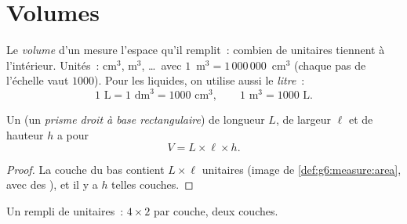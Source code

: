 \section{Volumes}

\begin{definition}[Volume]\label{def:g6:measure:volume}
Le \emph{volume} d'un  mesure l'espace qu'il
remplit~: combien de  unitaires tiennent à l'intérieur.
Unités~: cm$^3$, m$^3$, \dots\ avec
$1$~m$^3 = 1\,000\,000$~cm$^3$ (chaque pas de l'échelle vaut
$1000$). Pour les liquides, on utilise aussi le \emph{litre}~:
\[
1 \text{ L} = 1 \text{ dm}^3 = 1000 \text{ cm}^3,
\qquad
1 \text{ m}^3 = 1000 \text{ L}.
\]
\end{definition}

\begin{proposition}\label{prop:g6:measure:box}
Un  (un \emph{prisme droit à base rectangulaire}) de longueur $L$,
de largeur $\ell$ et de hauteur $h$ a pour 
\[
V = L \times \ell \times h .
\]
\end{proposition}

\begin{proof}
La couche du bas contient $L \times \ell$  unitaires
(image de \cref{def:g6:measure:area}, avec des ), et il y a $h$
telles couches.
\end{proof}

\begin{omfigure}

{\small Un  rempli de  unitaires~: $4 \times 2$  par
couche, deux couches.}
\end{omfigure}

